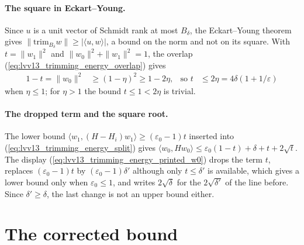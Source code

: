 \documentclass{article}
\begin{document}
\paragraph{The square in Eckart--Young.} Since $u$ is a unit vector of
Schmidt rank at most $B_\delta$, the Eckart--Young theorem gives
$\|\mathrm{trim}_{B_\delta}w\|\ge|\langle u,w\rangle|$, a bound on the norm
and not on its square. With $t=\|w_1\|^2$ and
$\|w_0\|^2+\|w_1\|^2=1$, the overlap (\ref{eq:lvv13_trimming_energy_overlap})
gives
\begin{align}
    1-t=\|w_0\|^2 & \ge(1-\eta)^2\ge1-2\eta,
     & \text{so }t & \le2\eta=4\delta(1+1/\varepsilon)
    \label{eq:lvv13_trimming_energy_mass}
\end{align}
when $\eta\le1$; for $\eta>1$ the bound $t\le1<2\eta$ is trivial.

\paragraph{The dropped term and the square root.} The lower bound
$\langle w_1,(H-H_i)w_1\rangle\ge(\varepsilon_0-1)t$ inserted into
(\ref{eq:lvv13_trimming_energy_split}) gives
$\langle w_0,Hw_0\rangle\le\varepsilon_0(1-t)+\delta+t+2\sqrt t$. The
display (\ref{eq:lvv13_trimming_energy_printed_w0}) drops the term $t$,
replaces $(\varepsilon_0-1)t$ by $(\varepsilon_0-1)\delta'$ although only
$t\le\delta'$ is available, which gives a lower bound only when
$\varepsilon_0\le1$, and writes $2\sqrt\delta$ for the
$2\sqrt{\delta'}$ of the line before. Since $\delta'\ge\delta$, the last
change is not an upper bound either.

\section{The corrected bound}
\end{document}

